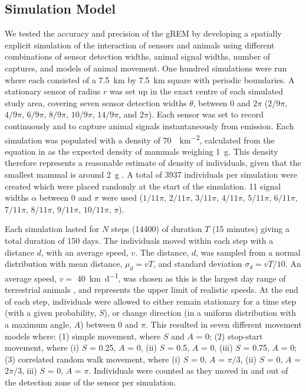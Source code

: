 \documentclass[a4paper,10pt,reqno,oneside]{amsart}
\begin{document}
\subsection*{Simulation Model}

We tested the accuracy and precision of the gREM by developing a spatially explicit simulation of the interaction of sensors and animals using different combinations of sensor detection widths, animal signal widths, number of captures, and models of animal movement. One hundred simulations were run where each consisted of a  \SI{7.5}{\kilo\meter} by \SI{7.5}{\kilo\meter} square with periodic boundaries. A stationary sensor of radius $r$ was set up in the exact centre of each simulated study area, covering seven sensor detection widths $\theta$, between 0 and $2\pi$ ($2/9\pi$, $4/9\pi$, $6/9\pi$, $8/9\pi$, $10/9\pi$, $14/9\pi$, and $2\pi$). Each sensor was set to record continuously and to capture animal signals instantaneously from emission. Each simulation was populated with a density of \SI{70}{\animals\per\kilo\meter\squared}, calculated from the equation in \cite{damuth1981population} as the expected density of mammals weighing \SI{1}{\gram}. This density therefore represents a reasonable estimate of density of individuals, given that the smallest mammal is around \SI{2}{\gram} \citep{jones2009pantheria}. A total of 3937 individuals per simulation were created which were placed randomly at the start of the simulation. 11 signal widths $\alpha$ between 0 and $\pi$ were used ($1/11\pi$, $2/11\pi$, $3/11\pi$, $4/11\pi$, $5/11\pi$, $6/11\pi$, $7/11\pi$, $8/11\pi$, $9/11\pi$, $10/11\pi$, $\pi$). 

Each simulation lasted for $N$ steps (14400) of duration $T$ (15 minutes) giving a total duration of 150 days. The individuals moved within each step with a distance $d$, with an average speed, $v$. The distance, $d$, was sampled from a normal distribution with mean distance, $\mu_d = vT$, and standard deviation $\sigma_d = vT/10$. An average speed, $v = $ \SI{40}{\kilo\meter \per \day}, was chosen as this is the largest day range of terrestrial animals \citep{carbone2005far}, and represents the upper limit of realistic speeds. At the end of each step, individuals were allowed to either remain stationary for a time step (with a given probability, $S$), or change direction (in a uniform distribution with a maximum angle, $A$) between 0 and $\pi$. This resulted in seven different movement models where: (1) simple movement, where $S$ and $A$ = 0; (2) stop-start movement, where (i) $S$ = 0.25, $A$ = 0, (ii) $S$ = 0.5, $A$ = 0, (iii) $S$ = 0.75, $A$ = 0; (3) correlated random walk movement, where (i) $S$ = 0, $A$ = $\pi/3$, (ii) $S$ = 0, $A$ = $2\pi/3$, iii) $S$ = 0, $A$ = $\pi$. Individuals were counted as they moved in and out of the detection zone of the sensor per simulation. 
\end{document}
